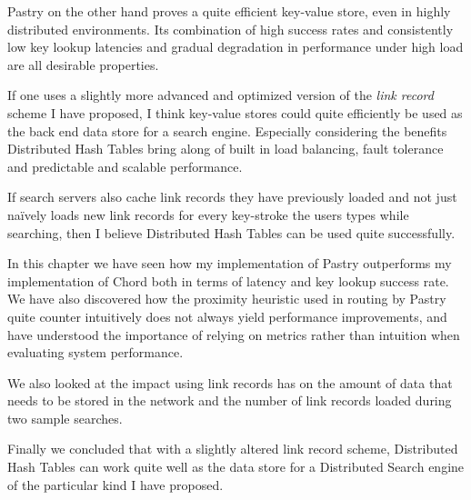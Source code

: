 Pastry on the other hand proves a quite efficient key-value store, even in highly distributed environments. Its combination of high success rates and consistently low key lookup latencies and gradual degradation in performance under high load are all desirable properties.

If one uses a slightly more advanced and optimized version of the \emph{link record} scheme I have proposed, I think key-value stores could quite efficiently be used as the back end data store for a search engine. Especially considering the benefits Distributed Hash Tables bring along of built in load balancing, fault tolerance and predictable and scalable performance.

If search servers also cache link records they have previously loaded and not just na\"ively loads new link records for every key-stroke the users types while searching, then I believe Distributed Hash Tables can be used quite successfully.

\mbox{}

In this chapter we have seen how my implementation of Pastry outperforms my implementation of Chord both in terms of latency and key lookup success rate.
We have also discovered how the proximity heuristic used in routing by Pastry quite counter intuitively does not always yield performance improvements, and have understood the importance of relying on metrics rather than intuition when evaluating system performance.

We also looked at the impact using link records has on the amount of data that needs to be stored in the network and the number of link records loaded during two sample searches.

Finally we concluded that with a slightly altered link record scheme, Distributed Hash Tables can work quite well as the data store for a Distributed Search engine of the particular kind I have proposed.
